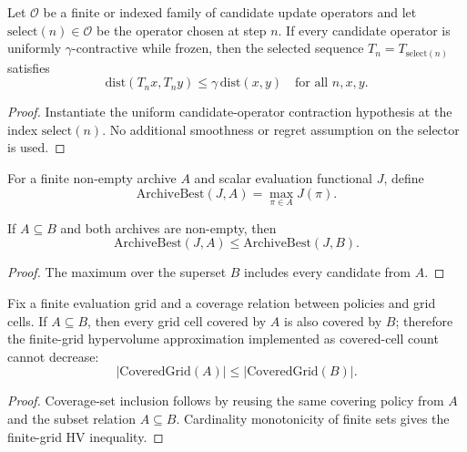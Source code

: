 \begin{theorem}
Let $\mathcal{O}$ be a finite or indexed family of candidate update operators and let $\mathrm{select}(n)\in\mathcal{O}$ be the operator chosen at step $n$.  If every candidate operator is uniformly $\gamma$-contractive while frozen, then the selected sequence $T_n=T_{\mathrm{select}(n)}$ satisfies
\begin{equation}
    \mathrm{dist}(T_n x,T_n y)\le \gamma\,\mathrm{dist}(x,y)
    \quad \text{for all } n,x,y.
\end{equation}
\end{theorem}
\begin{proof}
Instantiate the uniform candidate-operator contraction hypothesis at the index $\mathrm{select}(n)$.  No additional smoothness or regret assumption on the selector is used.
\end{proof}

\begin{definition}
For a finite non-empty archive $A$ and scalar evaluation functional $J$, define
\begin{equation}
    \mathrm{ArchiveBest}(J,A)=\max_{\pi\in A} J(\pi).
\end{equation}
\end{definition}

\begin{theorem}
If $A\subseteq B$ and both archives are non-empty, then
\begin{equation}
    \mathrm{ArchiveBest}(J,A)\le \mathrm{ArchiveBest}(J,B).
\end{equation}
\end{theorem}
\begin{proof}
The maximum over the superset $B$ includes every candidate from $A$.
\end{proof}

\begin{theorem}
Fix a finite evaluation grid and a coverage relation between policies and grid cells.  If $A\subseteq B$, then every grid cell covered by $A$ is also covered by $B$; therefore the finite-grid hypervolume approximation implemented as covered-cell count cannot decrease:
\begin{equation}
    |\mathrm{CoveredGrid}(A)| \le |\mathrm{CoveredGrid}(B)|.
\end{equation}
\end{theorem}
\begin{proof}
Coverage-set inclusion follows by reusing the same covering policy from $A$ and the subset relation $A\subseteq B$.  Cardinality monotonicity of finite sets gives the finite-grid HV inequality.
\end{proof}

